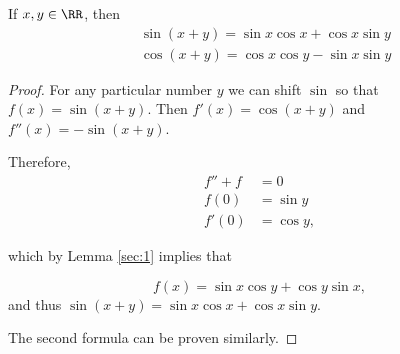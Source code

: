 \documentclass[11pt]{scrartcl}
\begin{document}
\begin{theorem}
  If $x, y \in \RR$, then
  \begin{align}
    &\sin(x+y) = \sin x\cos x + \cos x \sin y\\
    &\cos(x+y) = \cos x \cos y - \sin x \sin y
  \end{align}
\end{theorem}
\begin{proof}
  For any particular number $y$ we can shift $\sin$ so that
  $f(x) = \sin(x+y)$. Then $f'(x) = \cos(x+y)$ and
  $f''(x) = -\sin(x+y)$.

  Therefore,
  \begin{align}
    f''   + f & = 0 \\
    f(0)      & = \sin y \\
    f'(0)     & = \cos y,
  \end{align}

  which by Lemma \ref{sec:1} implies that
  
  \begin{equation*}
    f(x) = \sin x \cos y + \cos y \sin x,
  \end{equation*}
  and thus $\sin(x+y) = \sin x\cos x + \cos x \sin y$.

  The second formula can be proven similarly.

\end{proof}
    
\end{document}
